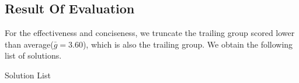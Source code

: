 \subsection{Result Of Evaluation}
For the effectiveness and conciseness, we truncate the trailing group scored lower than average($\bar{g}=3.60$), which is also the trailing group. We obtain the following list of solutions.

\begin{table}[ht]
\caption{Solution List}
\label{tab:solution}
\end{table}

